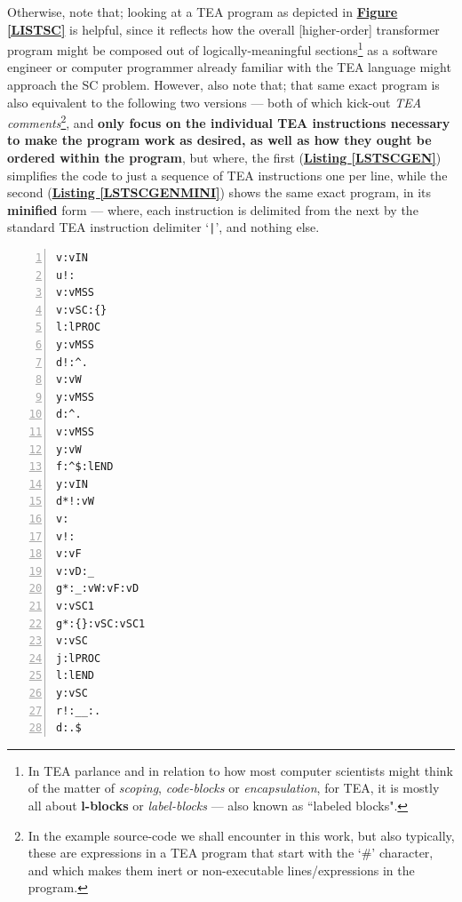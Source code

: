 \documentclass[a4paper, 18pt]{book} %
\begin{document}
\begin{appendices}
Otherwise, note that; looking at a TEA program as depicted in \textbf{\hyperref[LISTSC]{Figure \ref{LISTSC}}} is helpful, since it reflects how the overall [higher-order] transformer program might be composed out of logically-meaningful sections\footnote{In TEA parlance and in relation to how most computer scientists might think of the matter of \textit{scoping}, \textit{code-blocks} or \textit{encapsulation}, for TEA, it is mostly all about \textbf{l-blocks} or \textit{label-blocks} --- also known as ``labeled blocks"\cite{Lutalo2024TEATAZ}.} as a software engineer or computer programmer already familiar with the TEA language might approach the SC problem. However, also note that; that same exact program is also equivalent to the following two versions --- both of which kick-out \textit{TEA comments}\footnote{In the example source-code we shall encounter in this work, but also typically, these are expressions in a TEA program that start with the `\#' character, and which makes them inert or non-executable lines/expressions in the program.}, and \textbf{only focus on the individual TEA instructions necessary to make the program work as desired, as well as how they ought be ordered within the program}, but where, the first (\textbf{\hyperref[LSTSCGEN]{Listing \ref{LSTSCGEN}}}) simplifies the code to just a sequence of TEA instructions one per line, while the second (\textbf{\hyperref[LSTSCGEN]{Listing \ref{LSTSCGENMINI}}}) shows the same exact program, in its \textbf{minified} form --- where, each instruction is delimited from the next by the standard TEA instruction delimiter `\verb!|!', and nothing else.

\vspace{2em}

  \begin{tcolorbox}[teaterminalstyle, title=TEA Program: SC-Generator, breakable]
  \begin{lstlisting}[language=TEA, label={LSTSCGEN}, numbers=left]
v:vIN
u!:
v:vMSS
v:vSC:{}
l:lPROC
y:vMSS
d!:^.
v:vW
y:vMSS
d:^.
v:vMSS
y:vW
f:^$:lEND
y:vIN
d*!:vW
v:
v!:
v:vF
v:vD:_
g*:_:vW:vF:vD
v:vSC1
g*:{}:vSC:vSC1
v:vSC
j:lPROC
l:lEND
y:vSC
r!:__:.
d:.$
   \end{lstlisting}
  \end{tcolorbox}
  \vspace{2em}



\end{appendices}
\end{document}
